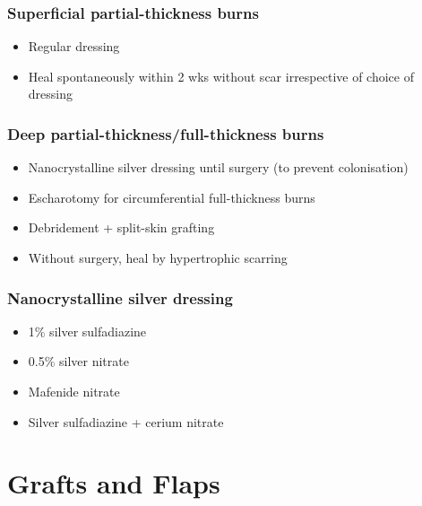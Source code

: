 \documentclass[
  14pt,
]{memoir}
\providecommand{\tightlist}{%
  \setlength{\itemsep}{0pt}\setlength{\parskip}{0pt}}
\begin{document}
\hypertarget{superficial-partial-thickness-burns}{%
\subsection{Superficial partial-thickness
burns}\label{superficial-partial-thickness-burns}}

\begin{itemize}
\tightlist
\item
  Regular dressing
\item
  Heal spontaneously within 2 wks without scar irrespective of choice of
  dressing
\end{itemize}

\hypertarget{deep-partial-thicknessfull-thickness-burns}{%
\subsection{Deep partial-thickness/full-thickness
burns}\label{deep-partial-thicknessfull-thickness-burns}}

\begin{itemize}
\tightlist
\item
  Nanocrystalline silver dressing until surgery (to prevent
  colonisation)
\item
  Escharotomy for circumferential full-thickness burns
\item
  Debridement + split-skin grafting
\item
  Without surgery, heal by hypertrophic scarring
\end{itemize}

\hypertarget{nanocrystalline-silver-dressing}{%
\subsection{Nanocrystalline silver
dressing}\label{nanocrystalline-silver-dressing}}

\begin{itemize}
\tightlist
\item
  1\% silver sulfadiazine
\item
  0.5\% silver nitrate
\item
  Mafenide nitrate
\item
  Silver sulfadiazine + cerium nitrate
\end{itemize}

\pagebreak

\hypertarget{grafts-and-flaps}{%
\chapter{Grafts and Flaps}\label{grafts-and-flaps}}
\end{document}
